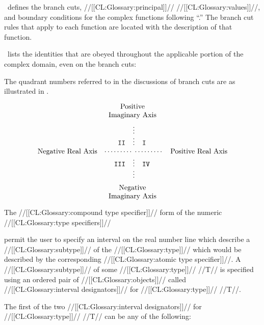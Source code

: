 \clisp\ defines the branch cuts, //[[CL:Glossary:principal]]// //[[CL:Glossary:values]]//, and boundary conditions for the complex functions following ``{\PrincipalValues}.'' The branch cut rules that apply to each function are located with the description of that function.

\Thenextfigure\ lists the identities that are obeyed throughout the applicable portion of the complex domain, even on the branch cuts:


The quadrant numbers referred to in the discussions of branch cuts are as illustrated in \thenextfigure.

{\def\Qfont#1{{\tt #1}} $$\vbox{\halign{\hfil #\hfil\cr Positive\cr Imaginary Axis\cr \noalign{\vskip 5pt} \vbox{\halign{#&#&#\cr \hfil&\hfil$\vdots$\hfil&\hfil\cr \hfil\Qfont{II\quad}&$\vdots$&\Qfont{\quad I}\hfil\cr \hfil Negative Real Axis\quad$\cdots\cdots\cdots$& &$\cdots\cdots\cdots$\quad Positive Real Axis\hfil\cr \hfil\Qfont{III\quad}&$\vdots$&\Qfont{\quad IV}\hfil\cr \hfil&\hfil$\vdots$\hfil&\hfil\cr }}\cr \noalign{\vskip 5pt} Negative\cr Imaginary Axis\cr}}$$ } 

\endsubsubsection%

\endsubsection%

 

The //[[CL:Glossary:compound type specifier]]// form of the numeric //[[CL:Glossary:type specifiers]]//

permit the user to specify an interval on the real number line which describe a //[[CL:Glossary:subtype]]// of the //[[CL:Glossary:type]]// which would be described by the corresponding //[[CL:Glossary:atomic type specifier]]//.  A //[[CL:Glossary:subtype]]// of some //[[CL:Glossary:type]]// //T// is specified using an ordered pair of //[[CL:Glossary:objects]]// called //[[CL:Glossary:interval designators]]// for //[[CL:Glossary:type]]// //T//.

The first of the two //[[CL:Glossary:interval designators]]// for //[[CL:Glossary:type]]// //T// can be any of the following:

